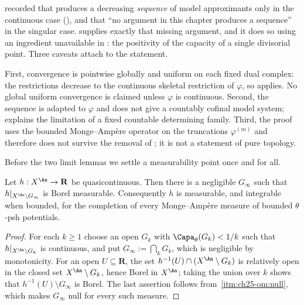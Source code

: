 \begin{remark}
\label{rem:ch25-sequential-vs-ch22}
 recorded that
 produces a decreasing \emph{sequence} of model
approximants only in the continuous case
(), and that ``no argument in
this chapter produces a sequence'' in the singular case.
 supplies exactly that missing
argument, and it does so using an ingredient unavailable in
: the positivity of the capacity of a single
divisorial point.  Three caveats attach to the statement.

First, convergence is pointwise globally and uniform on each fixed dual
complex: the restrictions decrease to the continuous skeletal restriction
of $\varphi$, so  applies.  No global uniform
convergence is claimed unless $\varphi$ is continuous.  Second, the
sequence is adapted to $\varphi$ and does not give a countably cofinal
model system;  explains the limitation
of a fixed countable determining family.  Third, the proof uses the
bounded Monge--Amp\`ere operator on the truncations
$\varphi^{(m)}$ and therefore does not survive the removal of
; it is not a statement of pure topology.
\end{remark}

Before the two limit lemmas we settle a measurability point once and for
all.

\begin{lemma}
\label{lem:ch25-quasicontinuous-measurable}
Let $h:X^{\An}\to\mathbf R$ be quasicontinuous.  Then there is a negligible
$G_\infty$ such that $h|_{X^{\An}\setminus G_\infty}$ is Borel
measurable.  Consequently $h$ is measurable, and integrable when bounded,
for the completion of every Monge--Amp\`ere measure of bounded
$\theta$-psh potentials.
\end{lemma}

\begin{proof}
For each $k\geq1$ choose an open $G_k$ with
$\Capa_\theta(G_k)<1/k$ such that $h|_{X^{\An}\setminus G_k}$ is
continuous, and put $G_\infty:=\bigcap_kG_k$, which is negligible by
monotonicity.  For an open $U\subseteq\mathbf R$, the set
$h^{-1}(U)\cap(X^{\An}\setminus G_k)$ is relatively open in the closed set
$X^{\An}\setminus G_k$, hence Borel in $X^{\An}$; taking the union over
$k$ shows that $h^{-1}(U)\setminus G_\infty$ is Borel.  The last
assertion follows from
\,\cref{itm:ch25-om:null}, which makes
$G_\infty$ null for every such measure.
\end{proof}

